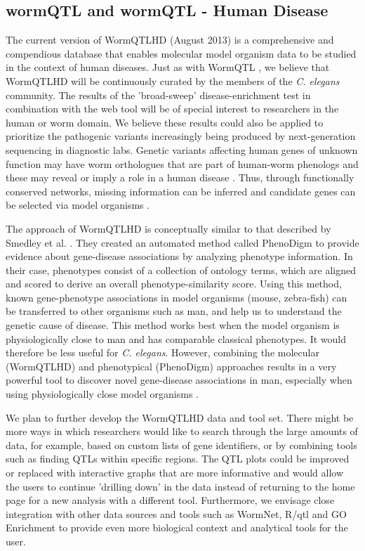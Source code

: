 \subsection{wormQTL and wormQTL - Human Disease}
The current version of WormQTLHD (August 2013) is a comprehensive and compendious database that 
enables molecular model organism data to be studied in the context of human diseases. Just as with 
WormQTL \cite{Snoek:2012}, we believe that WormQTLHD will be continuously curated by the members of 
the \emph{C. elegans} community. The results of the 'broad-sweep' disease-enrichment test in 
combination with the web tool will be of special interest to researchers in the human or worm 
domain. We believe these results could also be applied to prioritize the pathogenic variants 
increasingly being produced by next-generation sequencing in diagnostic labs. Genetic variants 
affecting human genes of unknown function may have worm orthologues that are part of human-worm 
phenologs and these may reveal or imply a role in a human disease \cite{Ostlund:2014}. Thus, 
through functionally conserved networks, missing information can be inferred and candidate genes 
can be selected via model organisms \cite{vanDerVelde:2014}.

The approach of WormQTLHD is conceptually similar to that described by Smedley et al. 
\cite{Smedley:2013}. They created an automated method called PhenoDigm to provide evidence about 
gene-disease associations by analyzing phenotype information. In their case, phenotypes consist of 
a collection of ontology terms, which are aligned and scored to derive an overall phenotype-similarity score. Using this 
method, known gene-phenotype associations in model organisms (mouse, zebra-fish) can be transferred 
to other organisms such as man, and help us to understand the genetic cause of disease. This method 
works best when the model organism is physiologically close to man and has comparable classical 
phenotypes. It would therefore be less useful for \emph{C. elegans}. However, combining the molecular 
(WormQTLHD) and phenotypical (PhenoDigm) approaches results in a very powerful tool to discover 
novel gene-disease associations in man, especially when using physiologically close model organisms \cite{vanDerVelde:2014}.

We plan to further develop the WormQTLHD data and tool set. There might be more ways in which 
researchers would like to search through the large amounts of data, for example, based on custom 
lists of gene identifiers, or by combining tools such as finding QTLs within specific regions. 
The QTL plots could be improved or replaced with interactive graphs that are more informative and 
would allow the users to continue 'drilling down' in the data instead of returning to the home page 
for a new analysis with a different tool. Furthermore, we envisage close integration with other data 
sources and tools such as WormNet, R/qtl and GO Enrichment to provide even more biological context 
and analytical tools for the user.


